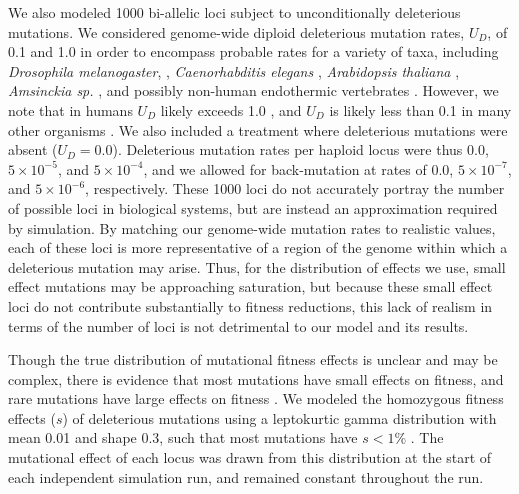 We also modeled 1000 bi-allelic loci subject to unconditionally deleterious mutations. We considered genome-wide diploid deleterious mutation rates, $U_D$, of 0.1 and 1.0 in order to encompass probable rates for a variety of taxa, including \emph{Drosophila melanogaster}, \citep{Haag:2007}, \emph{Caenorhabditis elegans} \citep{Denver:2004}, \emph{Arabidopsis thaliana} \citep{Shaw:2000}, \emph{Amsinckia sp.} \citep{Schoen:2005}, and possibly non-human endothermic vertebrates \citep{Baer:2007}. However, we note that in humans $U_D$ likely exceeds 1.0 \citep{Keightley:2012}, and $U_D$ is likely less than 0.1 in many other organisms \citep{Baer:2007, Halligan:2009}. We also included a treatment where deleterious mutations were absent ($U_D = 0.0$). Deleterious mutation rates per haploid locus were thus 0.0, $5\times10^{-5}$, and $5\times10^{-4}$, and we allowed for back-mutation at rates of 0.0, $5\times10^{-7}$, and $5\times10^{-6}$, respectively. %
These 1000 loci do not accurately portray the number of possible loci in biological systems, but are instead an approximation required by simulation. By matching our genome-wide mutation rates to realistic values, each of these loci is more representative of a region of the genome within which a deleterious mutation may arise. Thus, for the distribution of effects we use, small effect mutations may be approaching saturation, but because these small effect loci do not contribute substantially to fitness reductions, this lack of realism in terms of the number of loci is not detrimental to our model and its results.

Though the true distribution of mutational fitness effects is unclear and may be complex, there is evidence that most mutations have small effects on fitness, and rare mutations have large effects on fitness \citep{Eyre:2007}. We modeled the homozygous fitness effects ($s$) of deleterious mutations using a leptokurtic gamma distribution with mean 0.01 and shape 0.3, such that most mutations have $s < 1\%$ \citep{Keightley:1994}. The mutational effect of each locus was drawn from this distribution at the start of each independent simulation run, and remained constant throughout the run.

